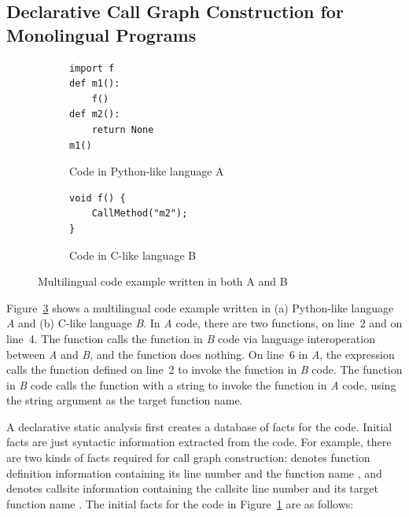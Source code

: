 \subsection{Declarative Call Graph Construction for Monolingual Programs}\label{lab:ovmono}
\begin{figure}[t]
  \centering
  \begin{subfigure}[t]{0.45\textwidth}
    \begin{lstlisting}[style=mpython]
import f
def m1():
    f()
def m2():
    return None
m1()
    \end{lstlisting}
    \vspace*{-.5em}
    \caption{Code in Python-like language A}
    \label{fig:exam:langA}
  \end{subfigure}
  \begin{subfigure}[t]{0.45\textwidth}
    \begin{lstlisting}[style=mcpp,firstnumber=7]
void f() {
    CallMethod("m2");
}
    \end{lstlisting}
    \vspace*{3.5em}
    \caption{Code in C-like language B}
    \label{fig:exam:langB}
  \end{subfigure}
  \vspace*{-.5em}
  \caption{Multilingual code example written in both A and B}
  \label{fig:exam}
\end{figure}

 Figure~\ref{fig:exam} shows a multilingual code example written in (a)
Python-like language {\it A} and (b) C-like language {\it B}. In {\it A} code, there
are two functions,  on line~2 and  on line~4. The function  calls the function  in {\it B} code via language interoperation between
{\it A} and {\it B}, and the function  does nothing. On line~6 in {\it
A}, the expression  calls the function  defined on line~2 to
invoke the function  in {\it B} code.
The function  in {\it B} code calls the  function with a
string   to invoke the function  in {\it A} code, using the
string  argument as the target function name.


A declarative static analysis first creates a database of facts for the
code. Initial facts are just syntactic information extracted from the code.
For example, there are two kinds of facts required for call graph
construction:  denotes function definition
information containing its line number  and the function name , and  denotes callsite information
containing the callsite line number  and its target function name . The initial facts for the code in Figure~\ref{fig:exam:langA} are as follows: 


